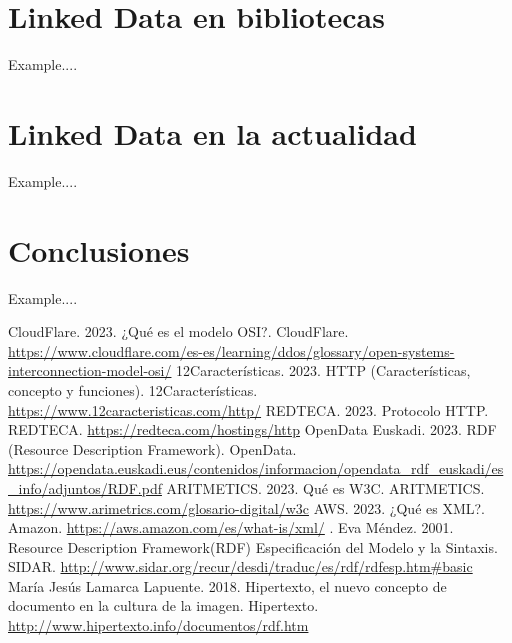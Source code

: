 \documentclass[11pt]{report}
\begin{document}
	\chapter{Linked Data en bibliotecas}
	Example....

	\chapter{Linked Data en la actualidad}
	Example....

	\chapter{Conclusiones}
	Example....

	\begin{thebibliography}{99}
	 CloudFlare. 2023.  ¿Qué es el modelo OSI?.  CloudFlare.  \url{https://www.cloudflare.com/es-es/learning/ddos/glossary/open-systems-interconnection-model-osi/}
	 12Características. 2023. HTTP (Características, concepto y funciones). 12Características. \url{https://www.12caracteristicas.com/http/}
	 REDTECA. 2023. Protocolo HTTP. REDTECA. \url{https://redteca.com/hostings/http}
	OpenData Euskadi. 2023. RDF (Resource Description Framework). OpenData. \url{https://opendata.euskadi.eus/contenidos/informacion/opendata_rdf_euskadi/es_info/adjuntos/RDF.pdf}
	 ARITMETICS. 2023. Qué es W3C. ARITMETICS. \url{https://www.arimetrics.com/glosario-digital/w3c}
	 AWS. 2023. ¿Qué es XML?. Amazon. \url{https://aws.amazon.com/es/what-is/xml/}
	.  Eva Méndez. 2001. Resource Description Framework(RDF)	Especificación del Modelo y la Sintaxis. SIDAR. \url{http://www.sidar.org/recur/desdi/traduc/es/rdf/rdfesp.htm#basic}
	 María Jesús Lamarca Lapuente. 2018. Hipertexto, el nuevo concepto de documento en la cultura de la imagen. Hipertexto. \url{http://www.hipertexto.info/documentos/rdf.htm}
	\end{thebibliography}

	
\end{document}

